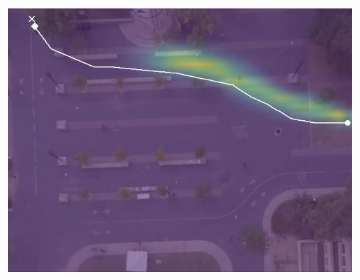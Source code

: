 \documentclass[letterpaper,10pt,conference]{ieeetran}
\begin{document}
\begin{figure}[t!]
\begin{subfigure}[t]{0.48\textwidth}
\begin{minipage}[c]{0.3\linewidth}
		\includegraphics[width=\linewidth]{./figures/bookstore/kit_1_2_t=370.jpg}
	\end{minipage}
	

\end{subfigure}
\end{figure}
\end{document}
